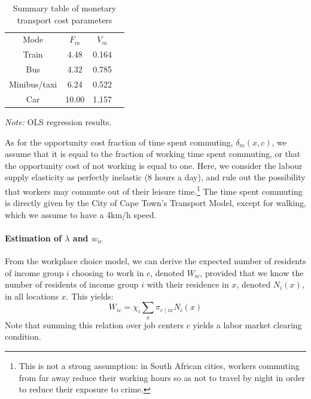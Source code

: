 \documentclass[12pt]{article}
\newcommand\fnote[1]{\captionsetup{justification=raggedright,singlelinecheck=false}\caption*{#1}}
\begin{document}
\begin{table}[htbp!]
\centering
\caption{Summary table of monetary transport cost parameters}
\label{tab_monet_cost}
\begin{tabular}{llll}
\cline{1-3}
\multicolumn{1}{c}{Mode} &
\multicolumn{1}{c}{$F_m$} &
\multicolumn{1}{c}{$V_m$}\\
\cline{1-3}
\multicolumn{1}{c}{Train} &
\multicolumn{1}{c}{4.48} &
\multicolumn{1}{c}{0.164}\\
\multicolumn{1}{c}{Bus} &
\multicolumn{1}{c}{4.32} &
\multicolumn{1}{c}{0.785}\\
\multicolumn{1}{c}{Minibus/taxi} &
\multicolumn{1}{c}{6.24} &
\multicolumn{1}{c}{0.522}\\
\multicolumn{1}{c}{Car} &
\multicolumn{1}{c}{10.00} &
\multicolumn{1}{c}{1.157}\\
\cline{1-3}
\end{tabular}
\fnote{\centering\scriptsize{\textit{Note:} OLS regression results.}}
\end{table}

As for the opportunity cost fraction of time spent commuting, $\delta_m(x,c)$, we assume that it is equal to the fraction of working time spent commuting, or that the opportunity cost of not working is equal to one. Here, we consider the labour supply elasticity as perfectly inelastic (8 hours a day), and rule out the possibility that workers may commute out of their leisure time.\footnote{This is not a strong assumption: in South African cities, workers commuting from far away reduce their working hours so as not to travel by night in order to reduce their exposure to crime.} The time spent commuting is directly given by the City of Cape Town's Transport Model, except for walking, which we assume to have a 4km/h speed.

\paragraph{Estimation of $\lambda$ and $w_{ic}$}

From the workplace choice model, we can derive the expected number of residents of income group $i$ choosing to work in $c$, denoted $W_{ic}$, provided that we know the number of residents of income group $i$ with their residence in $x$, denoted $N_{i}(x)$, in all locations $x$. This yields: 
\begin{equation*}
W_{ic}=\chi_i\sum_x\pi_{c \mid ix}N_i(x)\label{eq:origin-destination-1}
\end{equation*}
Note that summing this relation over job centers $c$ yields a labor market clearing condition.
\end{document}
